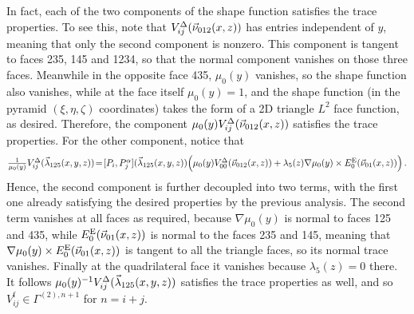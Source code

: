 In fact, each of the two components of the shape function satisfies the trace properties.
To see this, note that $V_{ij}^\Delta(\vec{\nu}_{012}(x,z))$ has entries independent of $y$, meaning that only the second component is nonzero.
This component is tangent to faces 235, 145 and 1234, so that the normal component vanishes on those three faces.
Meanwhile in the opposite face 435, $\mu_0(y)$ vanishes, so the shape function also vanishes, while at the face itself $\mu_0(y)=1$, and the shape function (in the pyramid $(\xi,\eta,\zeta)$ coordinates) takes the form of a 2D triangle $L^2$ face function, as desired.
Therefore, the component $\mu_0(y)V_{ij}^\Delta(\vec{\nu}_{012}(x,z))$ satisfies the trace properties.
For the other component, notice that
\begin{equation*}
	\textstyle{\frac{1}{\mu_0(y)}}V_{ij}^\Delta(\vec{\lambda}_{125}(x,y,z))
		\!=\![P_i,P_j^\alpha](\vec{\lambda}_{125}(x,y,z))\Big(\mu_0(y)V_{00}^\Delta(\vec{\nu}_{012}(x,z))
			+\lambda_5(z)\nabla\mu_0(y)\times E_{0}^{\mathrm{E}}(\vec{\nu}_{01}(x,z))\Big)\,.
\end{equation*}
Hence, the second component is further decoupled into two terms, with the first one already satisfying the desired properties by the previous analysis. 
The second term vanishes at all faces as required, because $\nabla\mu_0(y)$ is normal to faces 125 and 435, while $E_{0}^{\mathrm{E}}(\vec{\nu}_{01}(x,z))$ is normal to the faces 235 and 145, meaning that $\nabla\mu_0(y)\times E_{0}^{\mathrm{E}}(\vec{\nu}_{01}(x,z))$ is tangent to all the triangle faces, so its normal trace vanishes. 
Finally at the quadrilateral face it vanishes because $\lambda_5(z)=0$ there.
It follows $\mu_0(y)^{-1}V_{ij}^\Delta(\vec{\lambda}_{125}(x,y,z))$ satisfies the trace properties as well, and so $V_{ij}^\mathrm{f}\in\Gamma^{(2),n+1}$ for $n=i+j$.

